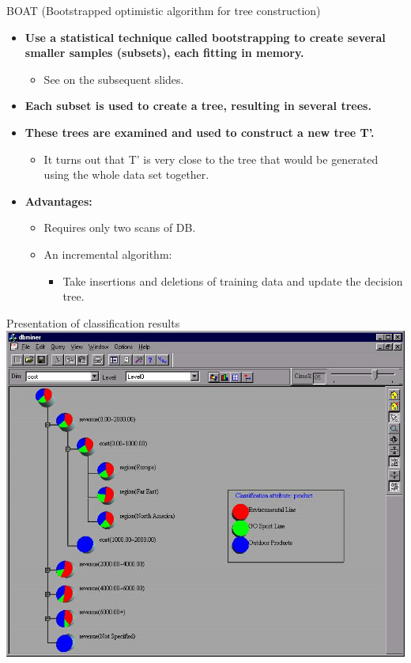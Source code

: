\documentclass[aspectratio=169,t,table]{beamer}
\begin{document}
  {
    \begin{frame}{BOAT (Bootstrapped optimistic algorithm for tree construction)}
      \begin{itemize}
        \item \textbf{Use a statistical technique called bootstrapping to create several smaller samples (subsets), each fitting in memory.}
        \begin{itemize}
          \item See on the subsequent slides.
        \end{itemize}
        \item \textbf{Each subset is used to create a tree, resulting in several trees.}
        \item \textbf{These trees are examined and used to construct a new tree T'.}
        \begin{itemize}
          \item It turns out that T' is very close to the tree that would be generated \\
          using the whole data set together.
        \end{itemize}
        \item \textbf{Advantages:}
        \begin{itemize}
          \item Requires only two scans of DB.
          \item An incremental algorithm:
          \begin{itemize}
            \item Take insertions and deletions of training data and update the decision tree.
          \end{itemize}
        \end{itemize}
      \end{itemize}
    \end{frame}
  }

  {
    \begin{frame}{Presentation of classification results}
      \centering
      \includegraphics[height=0.9\textheight]{img/classification1.jpeg}
    \end{frame}
  }
\end{document}
